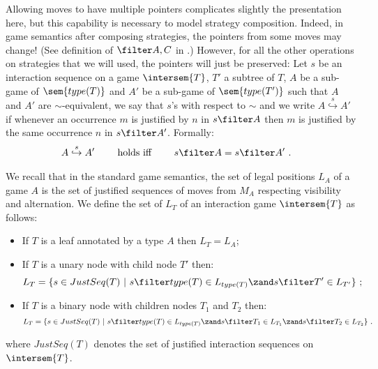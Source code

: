 Allowing moves to have multiple pointers complicates slightly the
presentation here, but this capability is necessary to model
strategy composition. Indeed, in game semantics after composing
strategies, the pointers from some moves may change! (See definition
of $\filter A,C$ in \cite{abramsky:game-semantics-tutorial}.)
However, for all the other operations on strategies that we will
used, the pointers will just be preserved:
Let $s$ be an  interaction sequence on a game
$\intersem{T}$, $T'$ a subtree of $T$, $A$ be a sub-game of
$\sem{type(T)}$ and $A'$ be a sub-game of $\sem{type(T')}$ such that $A$ and $A'$ are $\sim$-equivalent,
we say that $s$'s 
with respect to $\sim$ and we write $A\stackrel{s}\hookrightarrow A'$ if 
whenever an occurrence $m$ is justified by $n$ in $s\filter A$ then $m$ is justified by the same occurrence $n$ in $s \filter A'$. Formally:
\begin{align*}
 A\stackrel{s}\hookrightarrow A' \qquad \mbox{ holds iff } \qquad  &
s\filter A = s\filter A' \ .
\end{align*}

\begin{definition} We recall
that in the standard game semantics, the set of legal positions
$L_A$ of a game $A$ is the set of justified sequences of moves from
$M_A$ respecting visibility and alternation. We define the set of
 $L_T$ of an interaction game $\intersem{T}$ as
follows:
    \begin{itemize}
    \item If $T$ is a leaf annotated by a type $A$ then $L_T =
    L_A$;
    \item If $T$ is a unary node with child node $T'$ then:
    $$L_T = \{ s \in JustSeq(T) \ | \ s \filter type(T) \in L_{type(T)} \zand  s \filter T' \in L_{T'} \} \ ;$$
    \item If $T$ is a binary node with children nodes $T_1$ and $T_2$ then:
    $$L_T = \{ s \in JustSeq(T) \ | \ s \filter type(T) \in L_{type(T)} \zand  s \filter T_1 \in L_{T_1}
    \zand  s \filter T_2 \in L_{T_2} \} \ .$$
    \end{itemize}
    where $JustSeq(T)$ denotes the set of justified interaction sequences on
    $\intersem{T}$.
\end{definition}

